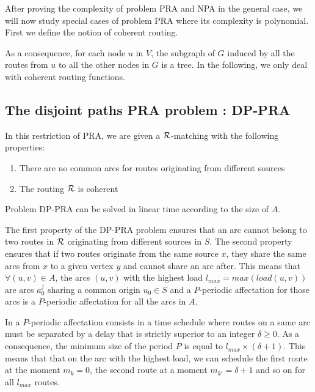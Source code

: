 \documentclass{article}
\newcommand\rmatching{$\cal R$-matching\xspace}
\begin{document}
After proving the complexity of problem PRA and NPA in the general case, we will now study special cases of problem PRA where its complexity is polynomial. First we define the notion of coherent routing.
% 

As a consequence, for each node $u$ in $V$, the subgraph of $G$ induced by all the routes from $u$ to all the other nodes in $G$ is a tree. In the following, we only deal with coherent routing functions.

\subsection{The disjoint paths PRA problem : DP-PRA}
In this restriction of PRA, we are given a \rmatching with the following properties:
\begin{enumerate}
\item There are no common arcs for routes originating from different sources
\item The routing $\cal R$ is coherent 
\end{enumerate}

\begin{proposition}
\label{DP-PRA}
Problem DP-PRA can be solved in linear time according to the size of $A$.
\end{proposition}

The first property of the DP-PRA problem ensures that an arc cannot belong to two routes in $\cal R$ originating from different sources in $S$. The second property ensures that if two routes originate from the same source $x$, they share the same arcs from $x$ to a given vertex $y$ and cannot share an arc after. This means that $\forall (u,v) \in A$, the arcs $(u,v)$ with the highest load $l_{max} = max(load(u,v))$ are arcs $a_0^j$ sharing a common origin $u_0 \in S$ and a $P$-periodic affectation for those arcs is a $P$-periodic affectation for all the arcs in $A$.

In a $P$-periodic affectation consists in a time schedule where routes on a same arc must be separated by a delay that is strictly superior to an integer $\delta \geq 0$. As a consequence, the minimum size of the period $P$ is equal to $l_{max} \times (\delta + 1)$. This means that that on the arc with the highest load, we can schedule the first route at the moment $m_k = 0$, the second route at a moment $m_{k'} = \delta + 1$ and so on for all $l_{max}$ routes. 
\end{document}
